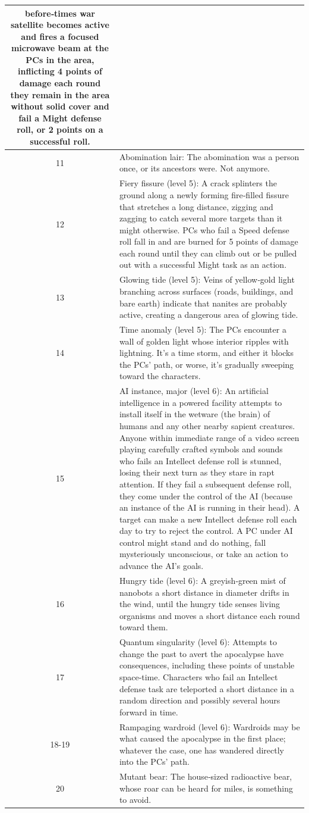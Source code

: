 \begin{longtable}{| c | p{15cm} |}
before‑times war satellite becomes active
and fires a focused microwave beam at
the PCs in the area, inflicting 4 points of
damage each round they remain in the area
without solid cover and fail a Might defense
roll, or 2 points on a successful roll. \\ \hline
11 &
Abomination lair: The abomination was
a person once, or its ancestors were. Not
anymore. \\ \hline
12 &
Fiery fissure (level 5): A crack splinters
the ground along a newly forming fire‑filled
fissure that stretches a long distance,
zigging and zagging to catch several more
targets than it might otherwise. PCs who fail
a Speed defense roll fall in and are burned
for 5 points of damage each round until
they can climb out or be pulled out with a
successful Might task as an action. \\ \hline
13 &
Glowing tide (level 5): Veins of
yellow‑gold light branching across surfaces
(roads, buildings, and bare earth) indicate
that nanites are probably active, creating a
dangerous area of glowing tide. \\ \hline
14 &
Time anomaly (level 5): The PCs
encounter a wall of golden light whose
interior ripples with lightning. It’s a
time storm, and either it blocks the PCs’
path, or worse, it’s gradually sweeping
toward the characters. \\ \hline
15 &
AI instance, major (level 6): An artificial
intelligence in a powered facility attempts
to install itself in the wetware (the brain)
of humans and any other nearby sapient
creatures. Anyone within immediate range
of a video screen playing carefully crafted
symbols and sounds who fails an Intellect
defense roll is stunned, losing their next
turn as they stare in rapt attention. If
they fail a subsequent defense roll, they
come under the control of the AI (because
an instance of the AI is running in their
head). A target can make a new Intellect
defense roll each day to try to reject the
control. A PC under AI control might stand and do nothing, fall mysteriously unconscious, or take an action to advance the AI’s goals. \\ \hline
16 &
Hungry tide (level 6): A greyish‑green
mist of nanobots a short distance in
diameter drifts in the wind, until the
hungry tide senses living organisms
and moves a short distance each round
toward them. \\ \hline
17 &
Quantum singularity (level 6): Attempts
to change the past to avert the apocalypse
have consequences, including these points
of unstable space‑time. Characters who fail
an Intellect defense task are teleported a
short distance in a random direction and
possibly several hours forward in time. \\ \hline
18-19 &
Rampaging wardroid (level 6): Wardroids may be what caused the apocalypse in the first place; whatever the case, one has wandered directly into the PCs’ path. \\ \hline
20 &
Mutant bear: The house‑sized
radioactive bear, whose roar can be heard
for miles, is something to avoid. \\ \hline

\end{longtable}

